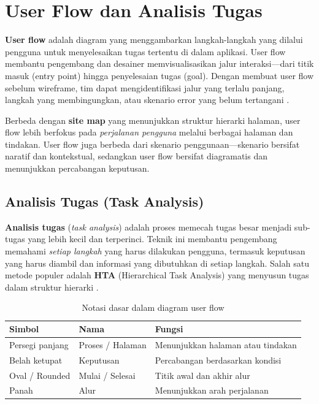 \section{User Flow dan Analisis Tugas}

\textbf{User flow} adalah diagram yang menggambarkan langkah-langkah yang dilalui pengguna untuk menyelesaikan tugas tertentu di dalam aplikasi. User flow membantu pengembang dan desainer memvisualisasikan jalur interaksi---dari titik masuk (entry point) hingga penyelesaian tugas (goal). Dengan membuat user flow sebelum wireframe, tim dapat mengidentifikasi jalur yang terlalu panjang, langkah yang membingungkan, atau skenario error yang belum tertangani \cite{mdnLearn}.

Berbeda dengan \textbf{site map} yang menunjukkan struktur hierarki halaman, user flow lebih berfokus pada \textit{perjalanan pengguna} melalui berbagai halaman dan tindakan. User flow juga berbeda dari skenario penggunaan---skenario bersifat naratif dan kontekstual, sedangkan user flow bersifat diagramatis dan menunjukkan percabangan keputusan.

\subsection{Analisis Tugas (Task Analysis)}

\textbf{Analisis tugas} (\textit{task analysis}) adalah proses memecah tugas besar menjadi sub-tugas yang lebih kecil dan terperinci. Teknik ini membantu pengembang memahami \textit{setiap langkah} yang harus dilakukan pengguna, termasuk keputusan yang harus diambil dan informasi yang dibutuhkan di setiap langkah. Salah satu metode populer adalah \textbf{HTA} (Hierarchical Task Analysis) yang menyusun tugas dalam struktur hierarki \cite{nngroup}.

\begin{table}[htbp]
\centering
\begin{tabular}{|P{2.5cm}|P{4.5cm}|P{5cm}|}
\hline
\textbf{Simbol} & \textbf{Nama} & \textbf{Fungsi} \\
\hline
Persegi panjang & Proses / Halaman & Menunjukkan halaman atau tindakan \\
\hline
Belah ketupat & Keputusan & Percabangan berdasarkan kondisi \\
\hline
Oval / Rounded & Mulai / Selesai & Titik awal dan akhir alur \\
\hline
Panah & Alur & Menunjukkan arah perjalanan \\
\hline
\end{tabular}
\caption{Notasi dasar dalam diagram user flow}
\end{table}

